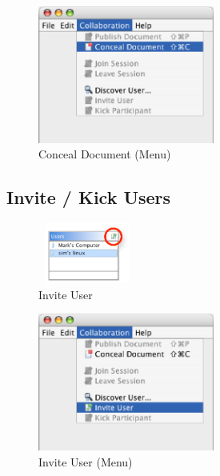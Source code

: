 \documentclass[11pt,a4paper]{article}
\begin{document}
\begin{figure}[H]
\begin{center}
  \includegraphics[height=1.78in, width=2.28in]{../images/usermanual/menu_collab_conceal.eps}
\caption{Conceal Document (Menu)}
\label{default}
\end{center}
\end{figure}

\subsection{Invite / Kick Users}
\label{invite_kick_users}

\begin{figure}[H]
\begin{center}
  \includegraphics[height=0.78in, width=1.28in]{../images/usermanual/g_uview_invite.eps}
\caption{Invite User}
\label{default}
\end{center}
\end{figure}

\begin{figure}[H]
\begin{center}
  \includegraphics[height=1.78in, width=2.28in]{../images/usermanual/menu_collab_invite.eps}
\caption{Invite User (Menu)}
\label{default}
\end{center}
\end{figure}
\end{document}

